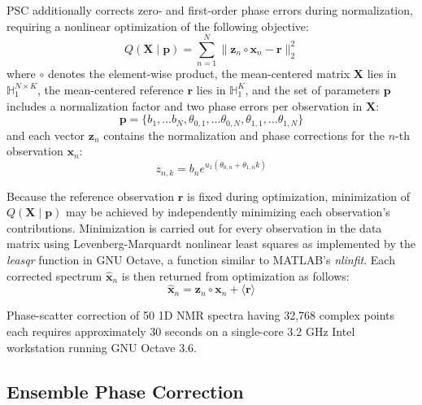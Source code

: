 \begin{doublespace}
PSC additionally corrects zero- and first-order phase errors during
normalization, requiring a nonlinear optimization of the following objective:
\begin{equation}
Q(\mathbf{X} \mid \mathbf{p})
 = \sum_{n=1}^N \| \mathbf{z}_n \circ \mathbf{x}_n - \mathbf{r} \|_2^2
\end{equation}
where $\circ$ denotes the element-wise product, the mean-centered matrix
$\mathbf{X}$ lies in $\mathbb{H}_1^{N \times K}$, the mean-centered reference
$\mathbf{r}$ lies in $\mathbb{H}_1^K$, and the set of parameters $\mathbf{p}$
includes a normalization factor and two phase errors per observation
in $\mathbf{X}$:
\begin{equation}
\mathbf{p} = \{
  b_1, \dots b_N,
  \theta_{0,1}, \dots \theta_{0,N},
  \theta_{1,1}, \dots \theta_{1,N} \}
\end{equation}
and each vector $\mathbf{z}_n$ contains the normalization and phase corrections
for the $n$-th observation $\mathbf{x}_n$:
\begin{equation}
z_{n,k} = b_n e^{u_1 (\theta_{0,n} + \theta_{1,n} k)}
\end{equation}

Because the reference observation $\mathbf{r}$ is fixed during optimization,
minimization of $Q(\mathbf{X} \mid \mathbf{p})$ may be achieved by
independently minimizing each observation's contributions. Minimization is
carried out for every observation in the data matrix using Levenberg-Marquardt
nonlinear least squares \cite{marquardt:jsiam1963} as implemented by the
{\it leasqr} function in GNU Octave, a function similar to MATLAB's
{\it nlinfit}. Each corrected spectrum $\hat{\mathbf{x}}_n$ is then returned
from optimization as follows:
\begin{equation}
\hat{\mathbf{x}}_n
 = \mathbf{z}_n \circ \mathbf{x}_n
 + \langle \mathbf{r} \rangle
\end{equation}

Phase-scatter correction of 50 1D \hnmr{} NMR spectra having 32,768 complex
points each requires approximately 30 seconds on a single-core 3.2 GHz Intel
workstation running GNU Octave 3.6.
\end{doublespace}

\subsection{Ensemble Phase Correction}

